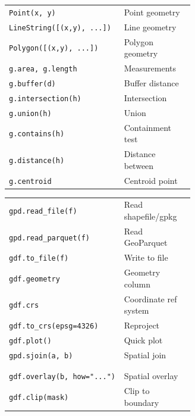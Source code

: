 \documentclass[10pt]{extarticle}
\begin{document}
\begin{multicols}{2}
\begin{tabularx}{\linewidth}{@{}>{\raggedright\arraybackslash}p{0.62\linewidth}@{\enspace}Y@{}}
\texttt{Point(x, y)}                & Point geometry \\
\texttt{LineString([(x,y), ...])}   & Line geometry \\
\texttt{Polygon([(x,y), ...])}      & Polygon geometry \\
\texttt{g.area, g.length}           & Measurements \\
\texttt{g.buffer(d)}                & Buffer distance \\
\texttt{g.intersection(h)}          & Intersection \\
\texttt{g.union(h)}                 & Union \\
\texttt{g.contains(h)}              & Containment test \\
\texttt{g.distance(h)}              & Distance between \\
\texttt{g.centroid}                  & Centroid point \\
\end{tabularx}

\begin{tabularx}{\linewidth}{@{}>{\raggedright\arraybackslash}p{0.62\linewidth}@{\enspace}Y@{}}
\texttt{gpd.read\_file(f)}          & Read shapefile/gpkg \\
\texttt{gpd.read\_parquet(f)}       & Read GeoParquet \\
\texttt{gdf.to\_file(f)}            & Write to file \\
\texttt{gdf.geometry}               & Geometry column \\
\texttt{gdf.crs}                     & Coordinate ref system \\
\texttt{gdf.to\_crs(epsg=4326)}     & Reproject \\
\texttt{gdf.plot()}                  & Quick plot \\
\texttt{gpd.sjoin(a, b)}            & Spatial join \\
 & \\
 \\
\texttt{gdf.overlay(b, how="...")} & Spatial overlay \\
\texttt{gdf.clip(mask)}             & Clip to boundary \\
\end{tabularx}


\end{multicols}
\end{document}
